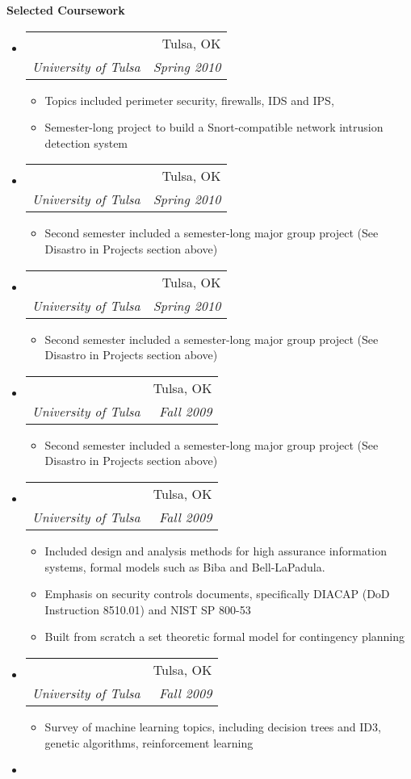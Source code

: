\documentclass[letterpaper,11pt]{article}
\makeatletter
\newcommand{\resitem}[1]{\item #1 \vspace{-2pt}}
\newcommand{\resheading}[1]{{\large \colorbox{mygrey}{\begin{minipage}{\textwidth}{\textbf{#1 \vphantom{p\^{E}}}}\end{minipage}}}}
\newcommand{\ressubheading}[4]{
\begin{tabular*}{6.5in}{l@{\extracolsep{\fill}}r}
		\textbf{\parbox{5in}{\raggedright #1 }} & #2 \\
		\textit{#3} & \textit{#4} \\
\end{tabular*}\vspace{-6pt}}
\makeatother
\begin{document}
\resheading{Selected Coursework}
\begin{itemize}

\item
	\ressubheading{Network Security}{Tulsa, OK}{University of Tulsa}{Spring 2010}
	\begin{itemize}
		\resitem{Topics included perimeter security, firewalls, IDS and IPS, }
		\resitem{Semester-long project to build a Snort-compatible network intrusion detection system}
	\end{itemize}
\item
	\ressubheading{Secure System Administration}{Tulsa, OK}{University of Tulsa}{Spring 2010}
	\begin{itemize}
		\resitem{Second semester included a semester-long major group project (See Disastro in Projects section above)}
	\end{itemize}
\item
	\ressubheading{Risk Management for Information Systems}{Tulsa, OK}{University of Tulsa}{Spring 2010}
	\begin{itemize}
		\resitem{Second semester included a semester-long major group project (See Disastro in Projects section above)}
	\end{itemize}
\item
	\ressubheading{Computational Neuroscience}{Tulsa, OK}{University of Tulsa}{Fall 2009}
	\begin{itemize}
		\resitem{Second semester included a semester-long major group project (See Disastro in Projects section above)}
	\end{itemize}
\item
	\ressubheading{Information Systems Assurance}{Tulsa, OK}{University of Tulsa}{Fall 2009}
	\begin{itemize}
		\resitem{Included design and analysis methods for high assurance information systems, formal models such as Biba and Bell-LaPadula.}
		\resitem{Emphasis on security controls documents, specifically DIACAP (DoD Instruction 8510.01) and NIST SP 800-53}
		\resitem{Built from scratch a set theoretic formal model for contingency planning}
	\end{itemize}
\item
	\ressubheading{Machine Learning}{Tulsa, OK}{University of Tulsa}{Fall 2009}
	\begin{itemize}
		\resitem{Survey of machine learning topics, including decision trees and ID3, genetic algorithms, reinforcement learning}
	\end{itemize}
\item

\end{itemize}
\end{document}
